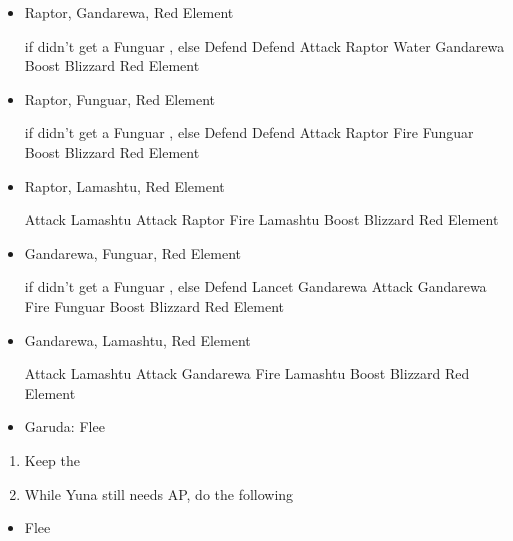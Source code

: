 \begin{encounters}
	\begin{itemize}
		\item Raptor, Gandarewa, Red Element
		      \begin{itemize}
			      \switch{\tidus}{\kimahri} if didn't get a Funguar \od, else Defend
			      \kimahrif Defend
			      \wakkaf Attack Raptor
			      \summon{\valefor}
			      \valeforf  Water Gandarewa
			      \valeforf Boost
			      \valeforf Blizzard Red Element
		      \end{itemize}
		\item Raptor, Funguar, Red Element
		      \begin{itemize}
			      \switch{\tidus}{\kimahri} if didn't get a Funguar \od, else Defend
			      \kimahrif Defend
			      \wakkaf Attack Raptor
			      \summon{\valefor}
			      \valeforf  Fire Funguar
			      \valeforf Boost
			      \valeforf Blizzard Red Element
		      \end{itemize}
		\item Raptor, Lamashtu, Red Element
		      \begin{itemize}
			      \switch{\tidus}{\kimahri}
			      \kimahrif  Attack Lamashtu
			      \wakkaf Attack Raptor
			      \switch{\auron}{\yuna}
			      \summon{\valefor}
			      \valeforf Fire Lamashtu
			      \valeforf Boost
			      \valeforf Blizzard Red Element
		      \end{itemize}
		\item Gandarewa, Funguar, Red Element
		      \begin{itemize}
			      \switch{\tidus}{\kimahri} if didn't get a Funguar \od, else Defend
			      \kimahrif Lancet Gandarewa
			      \wakkaf  Attack Gandarewa
			      \switch{\auron}{\yuna}
			      \summon{\valefor}
			      \valeforf Fire Funguar
			      \valeforf Boost
			      \valeforf Blizzard Red Element
		      \end{itemize}
		\item Gandarewa, Lamashtu, Red Element
		      \begin{itemize}
			      \switch{\tidus}{\kimahri}
			      \kimahrif  Attack Lamashtu
			      \wakkaf  Attack Gandarewa
			      \switch{\auron}{\yuna}
			      \summon{\valefor}
			      \valeforf Fire Lamashtu
			      \valeforf Boost
			      \valeforf Blizzard Red Element
		      \end{itemize}
		\item Garuda: Flee
	\end{itemize}
\end{encounters}
\begin{enumerate}[resume]
	\item Keep the \formation{\kimahri}{\wakka}{\yuna}
	\item While Yuna still needs AP, do the following
\end{enumerate}
\begin{encounters}
	\begin{itemize}
		\wakkaf Attack Raptors or Gandarewas
		\yunaf Defend
		\item Flee
	\end{itemize}
\end{encounters}

